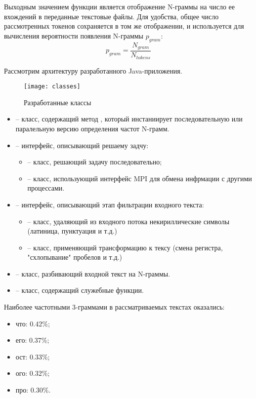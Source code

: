 Выходным значением функции является отображение N-граммы на число ее вхождений в переданные текстовые файлы. Для удобства, общее число рассмотренных токенов сохраняется в том же отображении, и используется для вычисления вероятности появления N-граммы $p_{gram}$:
$$
p_{gram} = \dfrac{N_{gram}}{N_{tokens}}
$$

Рассмотрим архитектуру разработанного Java-приложения. 

\begin{figure}[H]
	\centering
	\texttt{[image: classes]}
	\caption{Разработанные классы}
\end{figure}

\begin{itemize}
	\item {} -- класс, содержащий метод , который инстаниирует последовательную или паралельную версию определения частот N-грамм.
	\item {} -- интерфейс, описывающий решаему задчу:
		\begin{itemize}
			\item {} -- класс, решающий задачу последовательно;
			\item {} -- класс, использующий интерфейс MPI для обмена инфрмации с другими процессами.
		\end{itemize}
	\item {} -- интерфейс, описывающий этап фильтрации входного текста:
		\begin{itemize}
			\item {} -- класс, удаляющий из входного потока некириллические символы (латиница, пунктуация и т.д.)
			\item {} -- класс, применяющий трансформацию к тексу (смена регистра, "схлопывание" пробелов и т.д.)
		\end{itemize}
	\item {} -- класс, разбивающий входной текст на N-граммы.
	\item {} -- класс, содержащий служебные функции.
\end{itemize}

\noindent Наиболее частотными 3-граммами в рассматриваемых текстах оказались:
\begin{itemize}
	\item что: 0.42\%;
	\item его: 0.37\%;
	\item ост: 0.33\%;
	\item ого: 0.32\%;
	\item про: 0.30\%.
\end{itemize} 

